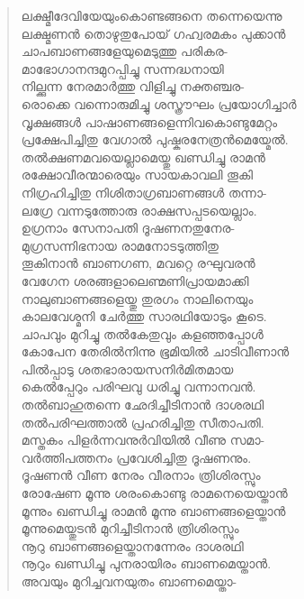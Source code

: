 \begin{verse}
ലക്ഷ്മീദേവിയേയുംകൊണ്ടങ്ങനെ തന്നെയെന്നു\\
ലക്ഷ്മണന്‍ തൊഴുതുപോയ് ഗഹ്വരമകം പുക്കാന്‍\\
ചാപബാണങ്ങളേയുമെടുത്തു പരികര-\\
മാഭോഗാനന്ദമുറപ്പിച്ചു സന്നദ്ധനായി\\
നില്ക്കുന്ന നേരമാര്‍ത്തു വിളിച്ചു നക്തഞ്ചര-\\
രൊക്കെ വന്നൊരുമിച്ചു ശസ്ത്രൗഘം പ്രയോഗിച്ചാര്‍\\
വൃക്ഷങ്ങള്‍ പാഷാണങ്ങളെന്നിവകൊണ്ടുമേറ്റം\\
പ്രക്ഷേപിച്ചിതു വേഗാല്‍ പുഷ്കരനേത്രന്‍മെയ്മേല്‍.\\
തല്‍ക്ഷണമവയെല്ലാമെയ്തു ഖണ്ഡിച്ചു രാമന്‍\\
രക്ഷോവീരന്മാരെയും സായകാവലി തൂകി\\
നിഗ്രഹിച്ചിതു നിശിതാഗ്രബാണങ്ങള്‍ തന്നാ-\\
ലഗ്രേ വന്നടുത്തോരു രാക്ഷസപ്പടയെല്ലാം.\\
ഉഗ്രനാം സേനാപതി ദൂഷണനതുനേര-\\
മുഗ്രസന്നിഭനായ രാമനോടടുത്തിതു\\
തൂകിനാന്‍ ബാണഗണ, മവറ്റെ രഘുവരന്‍\\
വേഗേന ശരങ്ങളാലെണ്മണിപ്രായമാക്കി\\
നാലുബാണങ്ങളെയ്തു തുരഗം നാലിനെയും\\
കാലവേശ്മനി ചേര്‍ത്തു സാരഥിയോടും കൂടെ.\\
ചാപവും മുറിച്ചു തല്‍കേതുവും കളഞ്ഞപ്പോള്‍\\
കോപേന തേരില്‍നിന്നു ഭൂമിയില്‍ ചാടിവീണാന്‍\\
പില്‍പ്പാടു ശതഭാരായസനിര്‍മിതമായ\\
കെല്‍പ്പേറും പരിഘവു ധരിച്ചു വന്നാനവന്‍.\\
തല്‍ബാഹുതന്നെ ഛേദിച്ചീടിനാന്‍ ദാശരഥി\\
തല്‍പരിഘത്താല്‍ പ്രഹരിച്ചിതു സീതാപതി.\\
മസ്തകം പിളര്‍ന്നവനുര്‍വിയില്‍ വീണു സമാ-\\
വര്‍ത്തിപത്തനം പ്രവേശിച്ചിതു ദൂഷണനും.\\
ദൂഷണന്‍ വീണ നേരം വീരനാം ത്രിശിരസ്സും\\
രോഷേണ മൂന്നു ശരംകൊണ്ടു രാമനെയെയ്താന്‍\\
മൂന്നും ഖണ്ഡിച്ചു രാമന്‍ മൂന്നു ബാണങ്ങളെയ്താന്‍\\
മൂന്നുമെയ്തുടന്‍ മുറിച്ചീടിനാന്‍ ത്രിശിരസ്സും\\
നൂറു ബാണങ്ങളെയ്താനന്നേരം ദാശരഥി\\
നൂറും ഖണ്ഡിച്ചു പുനരായിരം ബാണമെയ്താന്‍.\\
അവയും മുറിച്ചവനയുതം ബാണമെയ്താ-\\

\end{verse}
